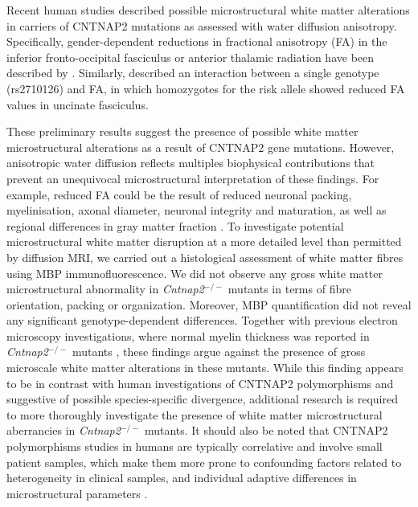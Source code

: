 Recent human studies described possible microstructural white matter
alterations in carriers of CNTNAP2 mutations as assessed with water diffusion
anisotropy.  Specifically, gender-dependent reductions in fractional anisotropy
(FA) in the inferior fronto-occipital fasciculus or anterior thalamic radiation
have been described by \textcite{tan2010}. Similarly,
\textcite{clemmvonhohenberg2013} described an interaction between a single
genotype (rs2710126) and FA, in which homozygotes for the risk allele showed
reduced FA values in uncinate fasciculus. 

These preliminary results suggest the presence of possible white matter
microstructural alterations as a result of CNTNAP2 gene mutations. However,
anisotropic water diffusion reflects multiples biophysical contributions that
prevent an unequivocal microstructural interpretation of these findings. For
example, reduced FA could be the result of reduced neuronal packing,
myelinisation, axonal diameter, neuronal integrity and maturation, as well as
regional differences in gray matter fraction \parencite{beaulieu2009}. To
investigate potential microstructural white matter disruption at a more detailed
level than permitted by diffusion MRI, we carried out a histological assessment
of white matter fibres using MBP immunofluorescence. We did not observe any
gross white matter microstructural abnormality in \textit{Cntnap2}$^{-/-}$ mutants in terms of
fibre orientation, packing or organization. Moreover, MBP quantification did not
reveal any significant genotype-dependent differences. Together with previous
electron microscopy investigations, where normal myelin thickness was reported
in \textit{Cntnap2}$^{-/-}$ mutants \parencite{poliak2003}, these findings argue against the
presence of gross microscale white matter alterations in these mutants. While
this finding appears to be in contrast with human investigations of CNTNAP2
polymorphisms and suggestive of possible species-specific divergence, additional
research is required to more thoroughly investigate the presence of white matter
microstructural aberrancies in \textit{Cntnap2}$^{-/-}$ mutants. It should also be noted that
CNTNAP2 polymorphisms studies in humans are typically correlative and involve
small patient samples, which make them more prone to confounding factors related
to heterogeneity in clinical samples, and individual adaptive differences in
microstructural parameters \parencite{scholz2009}.

